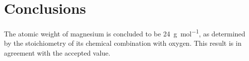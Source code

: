 \documentclass{article}
\begin{document}


\section{Conclusions}

The atomic weight of magnesium is concluded to be \SI{24}{\gram\per\mol}, as determined by the stoichiometry of its chemical combination with oxygen. This result is in agreement with the accepted value.







\end{document}
